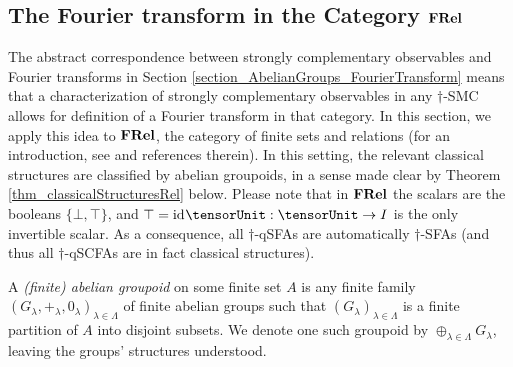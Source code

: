 \subsection{The Fourier transform in the Category $\mathbf{FRel}$}
\label{section_RelFT}


The abstract correspondence between strongly complementary observables and Fourier transforms in Section \ref{section_AbelianGroups_FourierTransform} means that a characterization of strongly complementary observables in any $\dagger$-SMC allows for definition of a Fourier transform in that category.  In this section, we apply this idea to $\mathbf{FRel}$, the category of finite sets and relations (for an introduction, see \cite{pavlovic2009quantum,zeng2015models} and references therein). In this setting, the relevant classical structures are classified by abelian groupoids, in a sense made clear by Theorem \ref{thm_classicalStructuresRel} below. Please note that in $\mathbf{FRel}$ the scalars are the booleans $\{\bot,\top\}$, and $\top = \id{\tensorUnit}: \tensorUnit \rightarrow I$ is the only invertible scalar. As a consequence, all $\dagger$-qSFAs are automatically $\dagger$-SFAs (and thus all $\dagger$-qSCFAs are in fact classical structures). 

\begin{defn}
A \emph{(finite) abelian groupoid} on some finite set $A$ is any finite family $(G_\lambda,+_\lambda,0_\lambda)_{\lambda \in \Lambda}$ of finite abelian groups such that $(G_\lambda)_{\lambda \in \Lambda}$ is a finite partition of $A$ into disjoint subsets. We denote one such groupoid by $\oplus_{\lambda \in \Lambda} G_\lambda$, leaving the groups' structures understood.
\end{defn}

